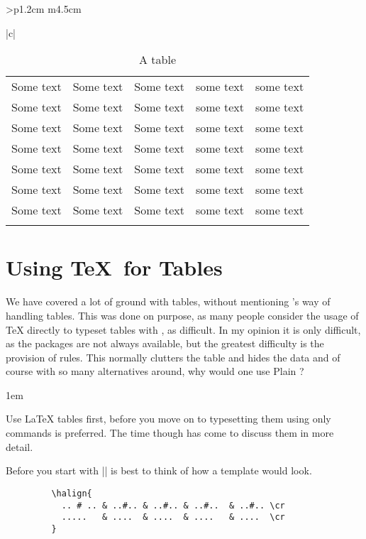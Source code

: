 \begin{tabular}{>{\bfseries}p{1.2cm} m{4.5cm}}
\begin{tabular}[t]{|c|}
\begin{longtable}
\begin{teXX}
\lipsum
\begin{table*}[htbp]
  \centering
  \begin{tabular}{p{1in}p{1in}p{1in}p{1in}p{1in}}
  \hline
  Some text & Some text & Some text & some text & some text\\
  Some text & Some text & Some text & some text & some text\\
  Some text & Some text & Some text & some text & some text\\
  Some text & Some text & Some text & some text & some text\\
  Some text & Some text & Some text & some text & some text\\
  Some text & Some text & Some text & some text & some text\\
  Some text & Some text & Some text & some text & some text\\
  \hline
  \caption{A table}
  \end{tabular}
\end{table*}
\lipsum\lipsum

\end{teXX}
\clearpage

\section{Using \TeX\ for Tables}
  
We have covered a lot of ground with \latex tables, without mentioning \tex's way of handling tables. This was done on purpose, as many people consider the usage of TeX directly to typeset tables with , as difficult. In my opinion it is only difficult, as the packages are not always available, but the greatest difficulty is the provision of rules. This normally clutters the table and hides the data and of course with so many alternatives around, why would one use Plain \tex?

\parindent1em

Use LaTeX tables first, before you move on to typesetting them using only \tex commands is preferred. The time though has come to discuss them in more detail.

Before you start with |\halign| is best to think of how a template would look. 

\begin{verbatim}
         \halign{
           .. # .. & ..#.. & ..#.. & ..#..  & ..#.. \cr
           .....   & ....  & ....  & ....   & ....  \cr
         }
\end{verbatim}



\end{longtable}
\end{tabular}
\end{tabular}
